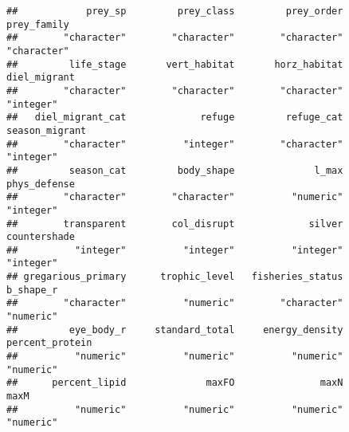 \documentclass[
]{article}
\newenvironment{Shaded}{\begin{snugshade}}{\end{snugshade}}
\newcommand{\ConstantTok}[1]{\textcolor[rgb]{0.00,0.00,0.00}{#1}}
\newcommand{\DocumentationTok}[1]{\textcolor[rgb]{0.56,0.35,0.01}{\textbf{\textit{#1}}}}
\newcommand{\FloatTok}[1]{\textcolor[rgb]{0.00,0.00,0.81}{#1}}
\newcommand{\FunctionTok}[1]{\textcolor[rgb]{0.00,0.00,0.00}{#1}}
\newcommand{\NormalTok}[1]{#1}
\newcommand{\OtherTok}[1]{\textcolor[rgb]{0.56,0.35,0.01}{#1}}
\newcommand{\SpecialCharTok}[1]{\textcolor[rgb]{0.00,0.00,0.00}{#1}}
\newcommand{\StringTok}[1]{\textcolor[rgb]{0.31,0.60,0.02}{#1}}
\begin{document}
\begin{verbatim}
##            prey_sp         prey_class         prey_order        prey_family 
##        "character"        "character"        "character"        "character" 
##         life_stage       vert_habitat       horz_habitat       diel_migrant 
##        "character"        "character"        "character"          "integer" 
##   diel_migrant_cat             refuge         refuge_cat     season_migrant 
##        "character"          "integer"        "character"          "integer" 
##         season_cat         body_shape              l_max       phys_defense 
##        "character"        "character"          "numeric"          "integer" 
##        transparent        col_disrupt             silver       countershade 
##          "integer"          "integer"          "integer"          "integer" 
## gregarious_primary      trophic_level   fisheries_status          b_shape_r 
##        "character"          "numeric"        "character"          "numeric" 
##         eye_body_r     standard_total     energy_density    percent_protein 
##          "numeric"          "numeric"          "numeric"          "numeric" 
##      percent_lipid              maxFO               maxN               maxM 
##          "numeric"          "numeric"          "numeric"          "numeric"
\end{verbatim}

\begin{Shaded}
\end{Shaded}
\end{document}

